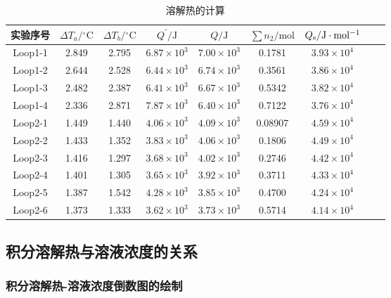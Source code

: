 \documentclass[cn,hazy,pku,12pt,normal,math=newtx,cite=super]{elegantnote}
\begin{document}
\begin{table}[htbp]
    \centering
    \caption{溶解热的计算}
    \begin{tabular}{ccccccccc}
        \toprule
        实验序号 & $\Delta T_a/\mathrm{{}^\circ C}$ & $\Delta T_b/\mathrm{{}^\circ C}$ & $Q^\prime/\mathrm{J}$ & $Q/\mathrm{J}$ & $\sum n_2/\mathrm{mol}$ & $Q_{\rm{s}}/\mathrm{J\cdot mol^{-1}}$ \\
        \midrule
        Loop1-1 & 2.849 & 2.795 & $6.87\times 10^{3}$ & $7.00\times 10^{3}$ & 0.1781 & $3.93\times 10^{4}$ \\
        Loop1-2 & 2.644 & 2.528 & $6.44\times 10^{3}$ & $6.74\times 10^{3}$ & 0.3561 & $3.86\times 10^{4}$ \\
        Loop1-3 & 2.482 & 2.387 & $6.41\times 10^{3}$ & $6.67\times 10^{3}$ & 0.5342 & $3.82\times 10^{4}$ \\
        Loop1-4 & 2.336 & 2.871 & $7.87\times 10^{3}$ & $6.40\times 10^{3}$ & 0.7122 & $3.76\times 10^{4}$ \\
        \midrule
        Loop2-1 & 1.449 & 1.440 & $4.06\times 10^{3}$ & $4.09\times 10^{3}$ & 0.08907 & $4.59\times 10^{4}$ \\
        Loop2-2 & 1.433 & 1.352 & $3.83\times 10^{3}$ & $4.06\times 10^{3}$ & 0.1806 & $4.49\times 10^{4}$ \\
        Loop2-3 & 1.416 & 1.297 & $3.68\times 10^{3}$ & $4.02\times 10^{3}$ & 0.2746 & $4.42\times 10^{4}$ \\
        Loop2-4 & 1.401 & 1.305 & $3.65\times 10^{3}$ & $3.92\times 10^{3}$ & 0.3711 & $4.33\times 10^{4}$ \\
        Loop2-5 & 1.387 & 1.542 & $4.28\times 10^{3}$ & $3.85\times 10^{3}$ & 0.4700 & $4.24\times 10^{4}$ \\
        Loop2-6 & 1.373 & 1.333 & $3.62\times 10^{3}$ & $3.73\times 10^{3}$ & 0.5714 & $4.14\times 10^{4}$ \\
        \bottomrule
    \end{tabular}
    \label{tab:6}
\end{table}

\subsection{积分溶解热与溶液浓度的关系}

\subsubsection{积分溶解热-溶液浓度倒数图的绘制}
\end{document}
